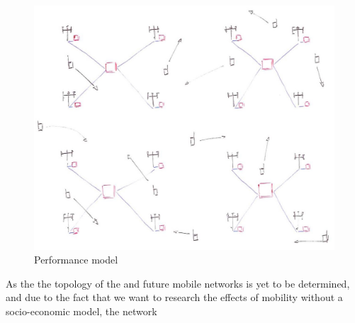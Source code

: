\begin{figure}[tb]
	\centering
	\includegraphics[width=\linewidth]{performance_delay.jpg} 
	\caption{Performance model}
	\label{fig:performance_model}
\end{figure}

As the the topology of the \xcloud and future mobile networks is yet to be determined, and due to the fact that we want to research the effects of mobility without a socio-economic model, the network 